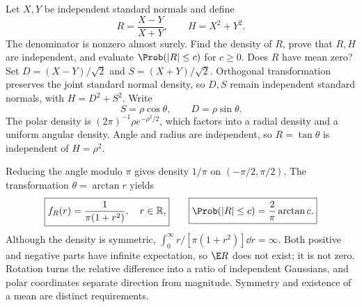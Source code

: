 Let $X,Y$ be independent standard normals and define
\[
R=\frac{X-Y}{X+Y},\qquad H=X^2+Y^2.
\]
The denominator is nonzero almost surely. Find the density of $R$, prove that $R,H$ are independent, and evaluate $\Prob(|R|\le c)$ for $c\ge0$. Does $R$ have mean zero?
\solution Set $D=(X-Y)/\sqrt2$ and $S=(X+Y)/\sqrt2$. Orthogonal transformation preserves the joint standard normal density, so $D,S$ remain independent standard normals, with $H=D^2+S^2$. Write
\[
S=\rho\cos\theta,\qquad D=\rho\sin\theta.
\]
The polar density is $(2\pi)^{-1}\rho e^{-\rho^2/2}$, which factors into a radial density and a uniform angular density. Angle and radius are independent, so $R=\tan\theta$ is independent of $H=\rho^2$.

Reducing the angle modulo $\pi$ gives density $1/\pi$ on $(-\pi/2,\pi/2)$. The transformation $\theta=\arctan r$ yields
\[
\boxed{f_R(r)=\frac1{\pi(1+r^2)},\quad r\in\mathbb R,}
\qquad
\boxed{\Prob(|R|\le c)=\frac2\pi\arctan c.}
\]
Although the density is symmetric, $\int_0^\infty r/[\pi(1+r^2)]\dd r=\infty$. Both positive and negative parts have infinite expectation, so $\E R$ does not exist; it is not zero.
\insight Rotation turns the relative difference into a ratio of independent Gaussians, and polar coordinates separate direction from magnitude. Symmetry and existence of a mean are distinct requirements.
